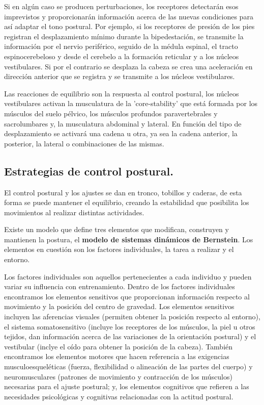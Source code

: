 Si en algún caso se producen perturbaciones, los receptores detectarán esos imprevistos y proporcionarán información acerca de las nuevas condiciones para así adaptar el tono postural. Por ejemplo, si los receptores de presión de los pies registran el desplazamiento mínimo durante la bipedestación, se transmite la información por el nervio periférico, seguido de la médula espinal, el tracto espinocerebeloso y desde el cerebelo a la formación reticular y a los núcleos vestibulares. Si por el contrario se desplaza la cabeza se crea una aceleración en dirección anterior que se registra y se transmite a los núcleos vestibulares. 

Las reacciones de equilibrio son la respuesta al control postural, los núcleos vestibulares activan la musculatura de la 'core-stability' que está formada por los músculos del suelo pélvico, los músculos profundos paravertebrales y sacrolumbares y, la musculatura abdominal y lateral. En función del tipo de desplazamiento se activará una cadena u otra, ya sea la cadena anterior, la posterior, la lateral o combinaciones de las mismas.

\subsection{Estrategias de control postural.} 
El control postural y los ajustes se dan en tronco, tobillos y caderas, de esta forma se puede mantener el equilibrio, creando la estabilidad que posibilita los movimientos al realizar distintas actividades.

Existe un modelo que define tres elementos que modifican, construyen y mantienen la postura, el \textbf{modelo de sistemas dinámicos de Bernstein}\cite{Bernstein}. Los elementos en cuestión son los factores individuales, la tarea a realizar y el entorno. 

Los factores individuales son aquellos pertenecientes a cada individuo y pueden variar su influencia con entrenamiento. Dentro de los factores individuales encontramos los elementos sensitivos que proporcionan información respecto al movimiento y la posición del centro de gravedad. Los elementos sensitivos incluyen las aferencias visuales (permiten obtener la posición respecto al entorno), el sistema somatosensitivo (incluye los receptores de los músculos, la piel u otros tejidos, dan información acerca de las variaciones de la orientación postural) y el vestibular (inclye el oído para obtener la posición de la cabeza). También encontramos los elementos motores que hacen referencia a las exigencias musculoesqueléticas (fuerza, flexibilidad o alineación de las partes del cuerpo) y neuromusculares (patrones de movimiento y contracción de los músculos)  necesarias para el ajuste postural; y, los elementos cognitivos que refieren a las necesidades psicológicas y cognitivas relacionadas con la actitud postural.

